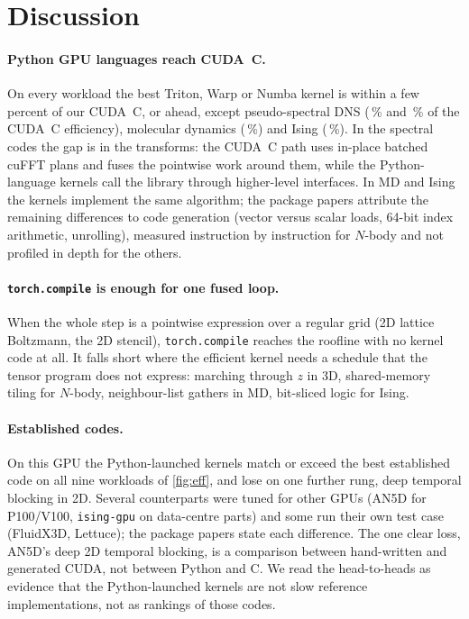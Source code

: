\documentclass[11pt]{article}
\begin{document}
\section{Discussion}

\paragraph{Python GPU languages reach CUDA~C.} On every workload the best Triton, Warp or
Numba kernel is within a few percent of our CUDA~C, or ahead, except pseudo-spectral DNS
(\SpecTwoDslOverCuda\,\% and \SpecThreeDslOverCuda\,\% of the CUDA~C efficiency), molecular
dynamics (\MdDslOverCuda\,\%) and Ising (\IsingDslOverCuda\,\%). In the spectral codes the gap is
in the transforms: the CUDA~C path uses in-place batched cuFFT plans and fuses the pointwise work
around them, while the Python-language kernels call the library through higher-level
interfaces. In MD and Ising the kernels implement the same algorithm; the package papers attribute the
remaining differences to code generation (vector versus scalar loads, 64-bit index arithmetic,
unrolling), measured instruction by instruction for $N$-body and not profiled in depth for the
others.

\paragraph{\texttt{torch.compile} is enough for one fused loop.} When the whole step is a
pointwise expression over a regular grid (2D lattice Boltzmann, the 2D stencil),
\texttt{torch.compile} reaches the roofline with no kernel code at all. It falls short where
the efficient kernel needs a schedule that the tensor program does not express: marching through
$z$ in 3D, shared-memory tiling for $N$-body, neighbour-list gathers in MD, bit-sliced logic for
Ising.

\paragraph{Established codes.} On this GPU the Python-launched kernels match or exceed the
best established code on all nine workloads of \cref{fig:eff}, and lose on one further rung,
deep temporal blocking in 2D. Several counterparts were tuned for other GPUs
(AN5D for P100/V100, \texttt{ising-gpu} on data-centre parts) and some run their own test case
(FluidX3D, Lettuce); the package papers state each difference. The one clear loss, AN5D's deep 2D
temporal blocking, is a comparison between hand-written and generated CUDA, not between Python
and C. We read the head-to-heads as evidence that the Python-launched kernels are not slow
reference implementations, not as rankings of those codes.
\end{document}
